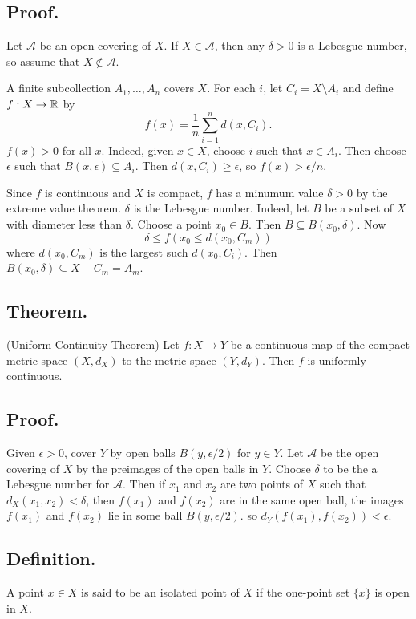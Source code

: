\documentclass[titlepage]{article}
\begin{document}
\subsection{Proof.} Let $\mathcal{A}$ be an open covering of $X$. If $X \in \mathcal{A}$, then any $\delta > 0$ is a Lebesgue number, so assume that $X \not\in \mathcal{A}$.

A finite subcollection $A_{1}, \ldots, A_{n}$ covers $X$. For each $i$, let $C_{i} = X \setminus A_{i}$ and define $f: X \to \mathbb{R}$ by 
$$f(x) = \frac{1}{n} \sum_{i=1}^{n} d(x, C_{i}).$$
$f(x) > 0$ for all $x$. Indeed, given $x \in X$, choose $i$ such that $x \in A_{i}$. Then choose $\epsilon$ such that $B(x, \epsilon) \subseteq A_{i}$. Then $d(x, C_{i}) \geq \epsilon$, so $f(x) > \epsilon/n$.

Since $f$ is continuous and $X$ is compact, $f$ has a minumum value $\delta > 0$ by the extreme value theorem. $\delta$ is the Lebesgue number. Indeed, let $B$ be a subset of $X$ with diameter less than $\delta$. Choose a point $x_{0} \in B$. Then $B \subseteq B(x_{0}, \delta)$. Now 
$$\delta \leq f(x_{0} \leq d(x_{0}, C_{m}))$$
where $d(x_{0}, C_{m})$ is the largest such $d(x_{0}, C_{i})$. Then $B(x_{0}, \delta) \subseteq X - C_{m} = A_{m}$.

\subsection{Theorem.} (Uniform Continuity Theorem) Let $f: X \to Y$ be a continuous map of the compact metric space $(X, d_{X})$ to the metric space $(Y, d_{Y})$. Then $f$ is uniformly continuous.

\subsection{Proof.} Given $\epsilon > 0$, cover $Y$ by open balls $B(y, \epsilon/2)$ for $y \in Y$. Let $\mathcal{A}$ be the open covering of $X$ by the preimages of the open balls in $Y$. Choose $\delta$ to be the a Lebesgue number for $\mathcal{A}$. Then if $x_{1}$ and $x_{2}$ are two points of $X$ such that $d_{X}(x_{1}, x_{2}) < \delta$, then $f(x_{1})$ and $f(x_{2})$ are in the same open ball, the images $f(x_{1})$ and $f(x_{2})$ lie in some ball $B(y, \epsilon/2)$. so $d_{Y}(f(x_{1}), f(x_{2})) < \epsilon$.

\subsection{Definition.} A point $x \in X$ is said to be an isolated point of $X$ if the one-point set $\{x\}$ is open in $X$.
\end{document}
